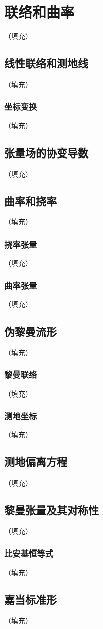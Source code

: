 \documentclass[hyperref,UTF8]{ctexbook}
\begin{document}
\chapter{联络和曲率}（填充）
\section{线性联络和测地线}（填充）
\subsection{坐标变换}（填充）
\section{张量场的协变导数}（填充）
\section{曲率和挠率}（填充）
\subsection{挠率张量}（填充）
\subsection{曲率张量}（填充）
\section{伪黎曼流形}（填充）
\subsection{黎曼联络}（填充）
\subsection{测地坐标}（填充）
\section{测地偏离方程}（填充）
\section{黎曼张量及其对称性}（填充）
\subsection{比安基恒等式}（填充）
\section{嘉当标准形}（填充）
\end{document}
